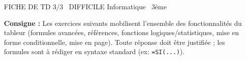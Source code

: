 \documentclass[11pt]{article}
\begin{document}
\begin{tcolorbox}[enhanced,colback=popink,colframe=popink,arc=10pt,boxrule=0pt,left=12pt,right=12pt,top=9pt,bottom=9pt]
{\color{white}\popxbold\small FICHE DE TD 3/3 \textbullet\ DIFFICILE \hfill Informatique \textbullet\ 3ème\par}
\end{tcolorbox}
\vspace{4pt}
\noindent \textbf{Consigne :} Les exercices suivants mobilisent l'ensemble des fonctionnalités du tableur (formules avancées, références, fonctions logiques/statistiques, mise en forme conditionnelle, mise en page). Toute réponse doit être justifiée ; les formules sont à rédiger en syntaxe standard (ex: \texttt{=SI(...)}).
\end{document}

